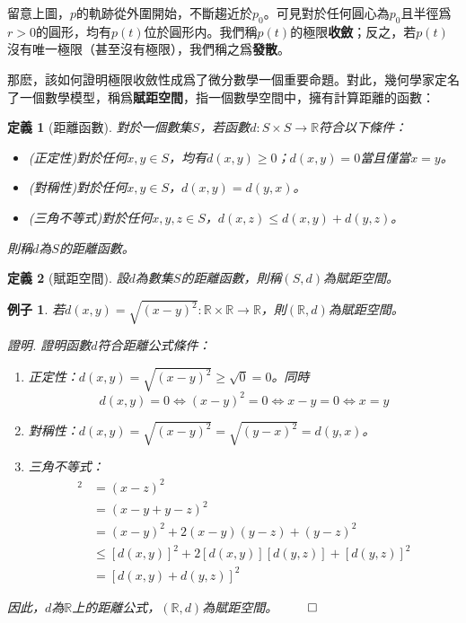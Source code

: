 \documentclass[12pt]{article}
\newtheorem{definition}{定義}
\newtheorem*{example}{例子}
\renewenvironment*{proof}{\textit{證明.}}{\hfill$\qed$}
\begin{document}
    留意上圖，$p$的軌跡從外圍開始，不斷趨近於$p_0$。可見對於任何圓心為$p_0$且半徑爲$r>0$的圓形，均有$p(t)$位於圓形内。我們稱$p(t)$的極限\textbf{收斂}；反之，若$p(t)$沒有唯一極限（甚至沒有極限），我們稱之爲\textbf{發散}。

    那麽，該如何證明極限收斂性成爲了微分數學一個重要命題。對此，幾何學家定名了一個數學模型，稱爲\textbf{賦距空間}，指一個數學空間中，擁有計算距離的函數：

    \begin{definition}[距離函數]
        對於一個數集$S$，若函數$d:S\times S\to\mathbb{R}$符合以下條件：\begin{itemize}
            \item (正定性)對於任何$x,y\in S$，均有$d(x,y)\geq 0$；$d(x,y)=0$當且僅當$x=y$。
            \item (對稱性)對於任何$x,y\in S$，$d(x,y)=d(y,x)$。
            \item (三角不等式)對於任何$x,y,z\in S$，$d(x,z)\leq d(x,y)+d(y,z)$。
        \end{itemize}
        則稱$d$為$S$的距離函數。
    \end{definition}

    \begin{definition}[賦距空間]
        設$d$為數集$S$的距離函數，則稱$(S,d)$為賦距空間。
    \end{definition}

    \begin{example}
        若$d(x,y)=\sqrt{(x-y)^2}:\mathbb{R}\times\mathbb{R}\to \mathbb{R}$，則$(\mathbb{R},d)$為賦距空間。

        \begin{proof}
            證明函數$d$符合距離公式條件：
            \begin{enumerate}
                \item 正定性：$d(x,y)=\sqrt{(x-y)^2}\geq \sqrt{0}=0$。同時$$d(x,y)=0\iff (x-y)^2=0\iff x-y=0\iff x=y$$
                \item 對稱性：$d(x,y)=\sqrt{(x-y)^2}=\sqrt{(y-x)^2}=d(y,x)$。
                \item 三角不等式：\begin{align*}
                    [d(x,z)]^2&=(x-z)^2\\
                    &=(x-y+y-z)^2\\
                    &=(x-y)^2+2(x-y)(y-z)+(y-z)^2\\
                    &\leq [d(x,y)]^2+2[d(x,y)][d(y,z)]+[d(y,z)]^2\\
                    &=[d(x,y)+d(y,z)]^2
                \end{align*}
            \end{enumerate}
            因此，$d$為$\mathbb{R}$上的距離公式，$(\mathbb{R},d)$為賦距空間。
        \end{proof}
    \end{example}
\end{document}
